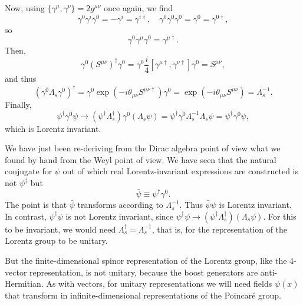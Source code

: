 \documentclass[11pt]{article}
\theoremstyle{definition}
\begin{document}
Now, using $\{\gamma^\mu, \gamma^\nu\} = 2g^{\mu\nu}$ once again, we find
\begin{equation}
    \gamma^0\gamma^i\gamma^0 = -\gamma^i = \gamma^{i\dagger}, \quad \gamma^0\gamma^0\gamma^0 = \gamma^0 = \gamma^{0\dagger},
\end{equation}
so
\begin{equation}
    \gamma^0\gamma^\mu\gamma^0 = \gamma^{\mu\dagger}.
\end{equation}
Then,
\begin{equation}
    \gamma^0(S^{\mu\nu})^\dagger\gamma^0 = \gamma^0\frac{i}{4}[\gamma^{\mu\dagger}, \gamma^{\nu\dagger}]\gamma^0 = S^{\mu\nu},
\end{equation}
and thus
\begin{equation}
    (\gamma^0\Lambda_s\gamma^0)^\dagger = \gamma^0\exp(-i\theta_{\mu\nu}S^{\mu\nu\dagger})\gamma^0 = \exp(-i\theta_{\mu\nu}S^{\mu\nu}) = \Lambda_s^{-1}.
\end{equation}
Finally,
\begin{equation}
    \psi^\dagger\gamma^0\psi \rightarrow (\psi^\dagger\Lambda_s^\dagger) \gamma^0 (\Lambda_s \psi) = \psi^\dagger \gamma^0 \Lambda_s^{-1}\Lambda_s \psi = \psi^\dagger \gamma^0 \psi,
\end{equation}
which is Lorentz invariant.

We have just been re-deriving from the Dirac algebra point of view what we found by hand from the Weyl point of view. We have seen that the natural conjugate for \(\psi\) out of which real Lorentz-invariant expressions are constructed is not \(\psi^{\dagger}\) but
\begin{equation}
\bar{\psi} \equiv \psi^{\dagger} \gamma^0.
\end{equation}
The point is that \(\bar{\psi}\) transforms according to \(\Lambda_s^{-1}\). Thus \(\bar{\psi}\psi\) is Lorentz invariant. In contrast, \(\psi^{\dagger}\psi\) is not Lorentz invariant, since \(\psi^{\dagger}\psi \rightarrow (\psi^{\dagger}\Lambda_s^{\dagger})(\Lambda_s \psi)\). For this to be invariant, we would need \(\Lambda_s^{\dagger} = \Lambda_s^{-1}\), that is, for the representation of the Lorentz group to be unitary.

But the finite-dimensional spinor representation of the Lorentz group, like the 4-vector representation, is not unitary, because the boost generators are anti-Hermitian. As with vectors, for unitary representations we will need fields \(\psi(x)\) that transform in infinite-dimensional representations of the Poincaré group.
\end{document}
